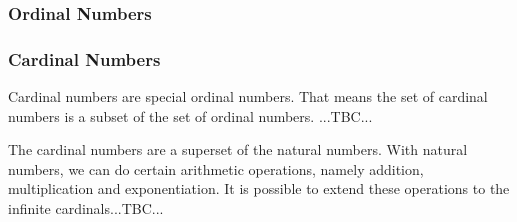 \subsubsection{Ordinal Numbers}







\subsubsection{Cardinal Numbers}
Cardinal numbers are special ordinal numbers. That means the set of cardinal numbers is a subset of the set of ordinal numbers. ...TBC...






The cardinal numbers are a superset of the natural numbers. With natural numbers, we can do certain arithmetic operations, namely addition, multiplication and exponentiation. It is possible to extend these operations to the infinite cardinals...TBC...

